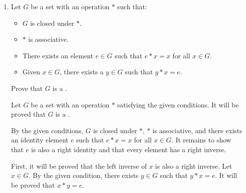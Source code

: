 \begin{enumerate}
\begin{subprove}
    Let \(P(k)\) be the proposition that \(a^{k} \equiv b^{k} \pmod{m}\).
    
    \textbf{Base case:} For \(k = 0\), \(a^{0} = 1 = b^{0}\), so \(a^{0} \equiv b^{0} \pmod{m}\).
    Therefore, \(P(0)\) is true.
    
    \textbf{Inductive step:} Suppose that \(P(k)\) is true for some nonnegative integer \(k\).
    That is, suppose that \(a^{k} \equiv b^{k} \pmod{m}\).
    It will be proved that \(P(k+1)\) is true.
    That is, it will be proved that \(a^{k+1} \equiv b^{k+1} \pmod{m}\).
    
    By the inductive hypothesis, \(a^{k} \equiv b^{k} \pmod{m}\).
    By assumption, \(a \equiv b \pmod{m}\).
    Since congruence modulo \(m\) is preserved under multiplication, \(a^{k} \cdot a \equiv b^{k} \cdot b \pmod{m}\).
    Therefore, \(a^{k+1} \equiv b^{k+1} \pmod{m}\).
    
    Therefore, \(P(k+1)\) is true.
    
    By , it follows that \(P(k)\) is true for all nonnegative integers \(k\).
    Therefore, \(a^{k} \equiv b^{k} \pmod{m}\) whenever \(k\) is a nonnegative integer.
  \end{subprove}
  \item Let \(G\) be a set with an operation \(*\) such that:
  \begin{itemize}
    \item \(G\) is closed under \(*\).
    \item \(*\) is associative.
    \item There exists an element \(e \in G\) such that \(e * x = x\) for all \(x \in G\).
    \item Given \(x \in G\), there exists a \(y \in G\) such that \(y * x = e\).
  \end{itemize}
  Prove that \(G\) is a .
  \begin{subprove}
    Let \(G\) be a set with an operation \(*\) satisfying the given conditions.
    It will be proved that \(G\) is a .
    
    By the given conditions, \(G\) is closed under \(*\), \(*\) is associative, and there exists an identity element \(e\) such that \(e * x = x\) for all \(x \in G\).
    It remains to show that \(e\) is also a right identity and that every element has a right inverse.
    
    First, it will be proved that the left inverse of \(x\) is also a right inverse.
    Let \(x \in G\).
    By the given condition, there exists \(y \in G\) such that \(y * x = e\).
    It will be proved that \(x * y = e\).
    

\end{subprove}
\end{enumerate}
